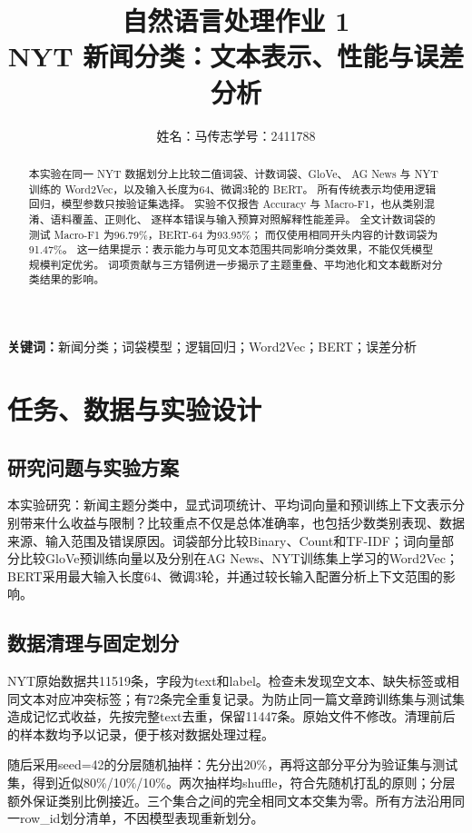 \documentclass[UTF8,a4paper,11pt,fontset=fandol]{ctexart}
\title{\textbf{自然语言处理作业 1}\\[0.4em]\Large NYT 新闻分类：文本表示、性能与误差分析}
\author{姓名：马传志\qquad 学号：2411788}
\date{}
\begin{document}
\maketitle
\begin{abstract}
本实验在同一 NYT 数据划分上比较二值词袋、计数词袋、GloVe、
AG News 与 NYT 训练的 Word2Vec，以及输入长度为64、微调3轮的 BERT。
所有传统表示均使用逻辑回归，模型参数只按验证集选择。
实验不仅报告 Accuracy 与 Macro-F1，也从类别混淆、语料覆盖、正则化、
逐样本错误与输入预算对照解释性能差异。
全文计数词袋的测试 Macro-F1 为96.79\%，BERT-64 为93.95\%；
而仅使用相同开头内容的计数词袋为91.47\%。
这一结果提示：表示能力与可见文本范围共同影响分类效果，不能仅凭模型规模判定优劣。
词项贡献与三方错例进一步揭示了主题重叠、平均池化和文本截断对分类结果的影响。
\end{abstract}
\noindent\textbf{关键词：}新闻分类；词袋模型；逻辑回归；Word2Vec；BERT；误差分析
\tableofcontents
{}\section{任务、数据与实验设计}
\subsection{研究问题与实验方案}
本实验研究：新闻主题分类中，显式词项统计、平均词向量和预训练上下文表示分别带来什么收益与限制？比较重点不仅是总体准确率，也包括少数类别表现、数据来源、输入范围及错误原因。词袋部分比较Binary、Count和TF-IDF；词向量部分比较GloVe预训练向量以及分别在AG News、NYT训练集上学习的Word2Vec；BERT采用最大输入长度64、微调3轮，并通过较长输入配置分析上下文范围的影响。

\subsection{数据清理与固定划分}
NYT原始数据共11519条，字段为text和label。检查未发现空文本、缺失标签或相同文本对应冲突标签；有72条完全重复记录。为防止同一篇文章跨训练集与测试集造成记忆式收益，先按完整text去重，保留11447条。原始文件不修改。清理前后的样本数均予以记录，便于核对数据处理过程。

随后采用seed=42的分层随机抽样：先分出20\%，再将这部分平分为验证集与测试集，得到近似80\%/\allowbreak{}10\%/\allowbreak{}10\%。两次抽样均shuffle，符合先随机打乱的原则；分层额外保证类别比例接近。三个集合之间的完全相同文本交集为零。所有方法沿用同一row\_\allowbreak{}id划分清单，不因模型表现重新划分。
\end{document}
